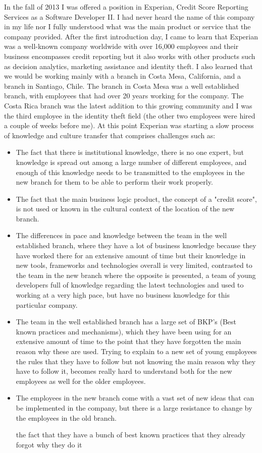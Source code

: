 \documentclass[12pt, letterpaper, twoside]{article}
\begin{document}
In the fall of 2013 I was offered a position in Experian, Credit Score Reporting Services as a Software Developer II.
I had never heard the name of this company in my life nor I fully understood what was the main product or service that 
the company provided. 
After the first introduction day, I came to learn that Experian was a well-known company worldwide with over 16,000
employees and their business encompasses credit reporting but it also works with other products such as decision 
analytics, marketing assistance and identity theft. I also learned that we would be working mainly with a branch in 
Costa Mesa, California, and a branch in Santiago, Chile. The branch in Costa Mesa was a well established branch, with 
employees that had over 20 years working for the company. The Costa Rica branch was the latest addition to this growing 
community and I was the third employee in the identity theft field (the other two employees were hired a couple of 
weeks before me). At this point Experian was starting a slow process of knowledge and culture transfer that comprises 
challenges such as:
\begin{itemize}
  \item The fact that there is institutional knowledge, there is no one expert, but knowledge is spread out among a 
large number of different employees, and enough of this knowledge needs to be transmitted to the employees in the new 
branch for them to be able to perform their work properly. 
  \item The fact that the main business logic product, the concept of a "credit score", is not used or known in the 
cultural context of the location of the new branch.
  \item The differences in pace and knowledge between the team in the well established branch, where they have a lot of 
  business knowledge because they have worked there for an extensive amount of time but their knowledge in new tools, 
  frameworks and technologies overall is very limited, contrasted to the team in the new branch where the opposite is
  presented, a team of young developers full of knowledge regarding the latest technologies and used to working at a 
  very high pace, but have no business knowledge for this particular company. 
  \item The team in the well established branch has a large set of BKP's (Best known practices and mechanisms), 
  which they have been using for an extensive amount of time to the point that they have forgotten the main reason
  why these are used. Trying to explain to a new set of young employees the rules that they have to follow but not
  knowing the main reason why they have to follow it, becomes really hard to understand both for the new employees
  as well for the older employees.
  \item The employees in the new branch come with a vast set of new ideas that can be implemented in the company, but
  there is a large resistance to change by the employees in the old branch.
  
  the fact that they have a bunch of best known practices that they already forgot why they do it 
\end{itemize}
\end{document}

